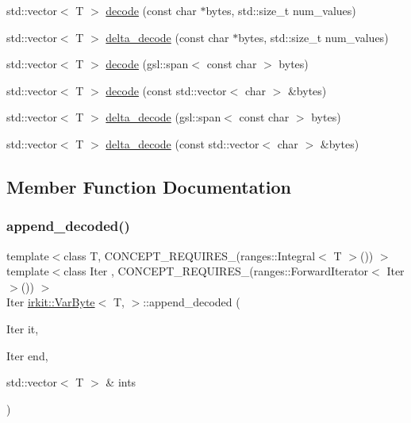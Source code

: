 \begin{DoxyCompactItemize}
\item 
std\+::vector$<$ T $>$ \mbox{\hyperlink{structirkit_1_1VarByte_afbc02998664ac8b7b91ad191d58ed49b}{decode}} (const char $\ast$bytes, std\+::size\+\_\+t num\+\_\+values)
\item 
std\+::vector$<$ T $>$ \mbox{\hyperlink{structirkit_1_1VarByte_aa9ef5e1ad8ef7e604d2b49108b7c0b06}{delta\+\_\+decode}} (const char $\ast$bytes, std\+::size\+\_\+t num\+\_\+values)
\item 
std\+::vector$<$ T $>$ \mbox{\hyperlink{structirkit_1_1VarByte_aaf5f6ea6d9d7e2e739dc15defaf89892}{decode}} (gsl\+::span$<$ const char $>$ bytes)
\item 
std\+::vector$<$ T $>$ \mbox{\hyperlink{structirkit_1_1VarByte_af3b00fc21d45e56ce87ccc06626e55c5}{decode}} (const std\+::vector$<$ char $>$ \&bytes)
\item 
std\+::vector$<$ T $>$ \mbox{\hyperlink{structirkit_1_1VarByte_a4f36c3ebab2071ebd9d47f4e3e4f3a42}{delta\+\_\+decode}} (gsl\+::span$<$ const char $>$ bytes)
\item 
std\+::vector$<$ T $>$ \mbox{\hyperlink{structirkit_1_1VarByte_aefcc29aed7e2f454dadcc869eea99201}{delta\+\_\+decode}} (const std\+::vector$<$ char $>$ \&bytes)
\end{DoxyCompactItemize}


\subsection{Member Function Documentation}
\mbox{\label{structirkit_1_1VarByte_a6f71f45fca0f585b4d7c0a704c214f81}} 
\subsubsection{\texorpdfstring{append\+\_\+decoded()}{append\_decoded()}}
{\footnotesize\ttfamily template$<$class T, C\+O\+N\+C\+E\+P\+T\+\_\+\+R\+E\+Q\+U\+I\+R\+E\+S\+\_\+(ranges\+::\+Integral$<$ T $>$()) $>$ \\
template$<$class Iter , C\+O\+N\+C\+E\+P\+T\+\_\+\+R\+E\+Q\+U\+I\+R\+E\+S\+\_\+(ranges\+::\+Forward\+Iterator$<$ Iter $>$()) $>$ \\
Iter \mbox{\hyperlink{structirkit_1_1VarByte}{irkit\+::\+Var\+Byte}}$<$ T, $>$\+::append\+\_\+decoded (\begin{DoxyParamCaption}\item[{Iter}]{it,  }\item[{Iter}]{end,  }\item[{std\+::vector$<$ T $>$ \&}]{ints }\end{DoxyParamCaption})\hspace{0.3cm}{\ttfamily [inline]}}

